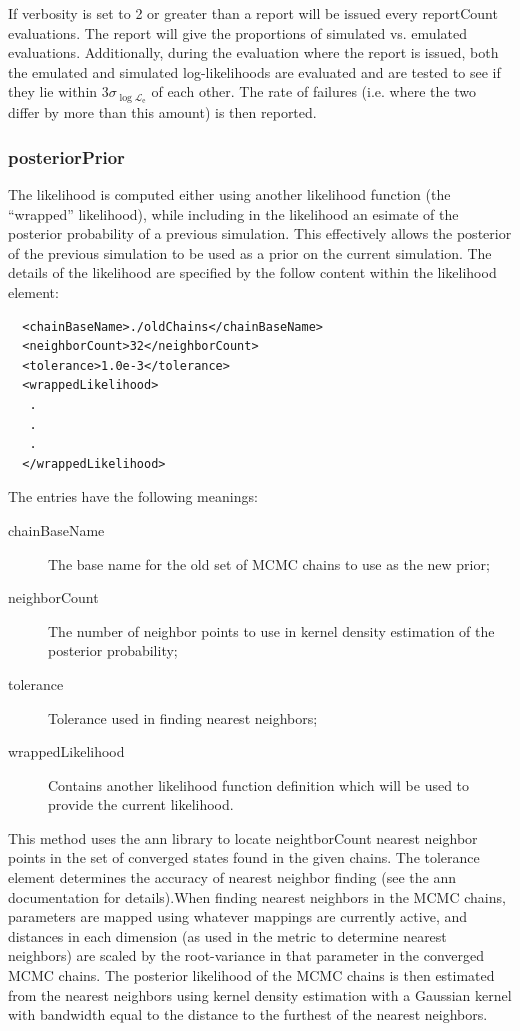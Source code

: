 If verbosity is set to 2 or greater than a report will be issued every {\normalfont \ttfamily reportCount} evaluations. The report will give the proportions of simulated vs. emulated evaluations. Additionally, during the evaluation where the report is issued, both the emulated and simulated log-likelihoods are evaluated and are tested to see if they lie within $3 \sigma_{\log\mathcal{L}_\mathrm{e}}$ of each other. The rate of failures (i.e. where the two differ by more than this amount) is then reported.

\subsubsection{posteriorPrior}

The likelihood is computed either using another likelihood function (the ``wrapped'' likelihood), while including in the likelihood an esimate of the posterior probability of a previous simulation. This effectively allows the posterior of the previous simulation to be used as a prior on the current simulation. The details of the likelihood are specified by the follow content within the {\normalfont \ttfamily likelihood} element:
\begin{verbatim}
  <chainBaseName>./oldChains</chainBaseName>
  <neighborCount>32</neighborCount>
  <tolerance>1.0e-3</tolerance>
  <wrappedLikelihood>
   .
   .
   .
  </wrappedLikelihood>
\end{verbatim}

The entries have the following meanings:
\begin{description}
\item[{\normalfont \ttfamily chainBaseName}] The base name for the old set of MCMC chains to use as the new prior;
\item[{\normalfont \ttfamily neighborCount}] The number of neighbor points to use in kernel density estimation of the posterior probability;
\item[{\normalfont \ttfamily tolerance}] Tolerance used in finding nearest neighbors;
\item[{\normalfont \ttfamily wrappedLikelihood}] Contains another likelihood function definition which will be used to provide the current likelihood.
\end{description}

This method uses the \gls{ann} library to locate {\normalfont \ttfamily neightborCount} nearest neighbor points in the set of converged states found in the given chains. The {\normalfont \ttfamily tolerance} element determines the accuracy of nearest neighbor finding (see the \gls{ann} documentation for details).When finding nearest neighbors in the MCMC chains, parameters are mapped using whatever mappings are currently active, and distances in each dimension (as used in the metric to determine nearest neighbors) are scaled by the root-variance in that parameter in the converged MCMC chains. The posterior likelihood of the MCMC chains is then estimated from the nearest neighbors using kernel density estimation with a Gaussian kernel with bandwidth equal to the distance to the furthest of the nearest neighbors.


